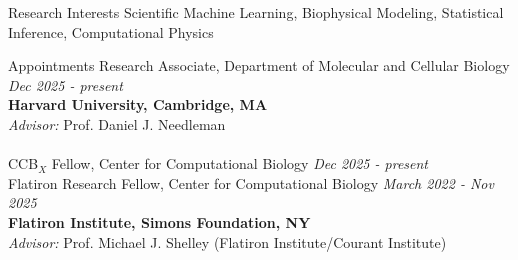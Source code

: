\documentclass{resume} %
\begin{document}

\begin{rSection}{Research Interests}
Scientific Machine Learning, Biophysical Modeling, Statistical Inference, Computational Physics
\end{rSection}

\begin{rSection}{\small{Appointments }}
{\small Research Associate, Department of Molecular
and Cellular Biology} \hfill {\small \textit{ Dec 2025 - present}} \\
{\small \bf Harvard University, Cambridge, MA} \\
{\small \textit{Advisor:}  Prof. Daniel J. Needleman} \\ \\
{\small CCB$_X$ Fellow, Center for Computational Biology } \hfill {\small \textit{Dec 2025 - present}} \\
{\small Flatiron Research Fellow, Center for Computational Biology  } \hfill {\small \textit{March 2022 - Nov 2025}} \\
{\small \bf Flatiron Institute, Simons Foundation, NY } \\
{\small \textit{Advisor:} Prof. Michael J. Shelley (Flatiron Institute/Courant Institute) }
\end{rSection}
\end{document}
